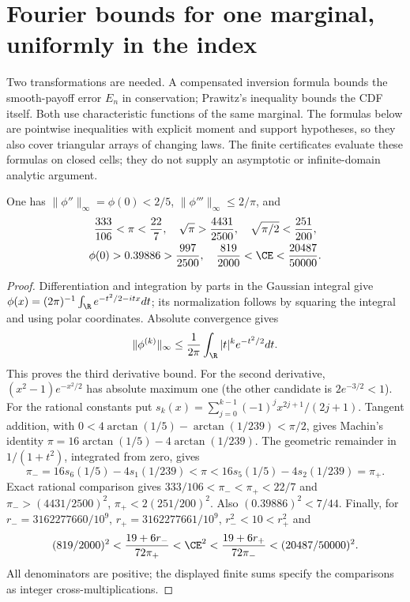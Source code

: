 \section{Fourier bounds for one marginal, uniformly in the index}\label{j:fourier:section}
Two transformations are needed. A compensated inversion formula bounds the
smooth-payoff error $E_n$ in conservation; Prawitz's inequality bounds the
CDF itself. Both use characteristic functions of the same marginal. The
formulas below are pointwise inequalities with explicit moment and support
hypotheses, so they also cover triangular arrays of changing laws. The finite
certificates evaluate these formulas on closed cells; they do not supply an
asymptotic or infinite-domain analytic argument.

\begin{lemma}\label{j:fourier:constants}
One has $\|\phi''\|_\infty=\phi(0)<2/5$,
$\|\phi'''\|_\infty\le2/\pi$, and
\begin{gather*}
 \frac{333}{106}<\pi<\frac{22}{7},\quad
 \sqrt\pi>\frac{4431}{2500},\quad
 \sqrt{\pi/2}<\frac{251}{200},\\
 \phi(0)>0.39886>\frac{997}{2500},\quad
 \frac{819}{2000}<\CE<\frac{20487}{50000}.
\end{gather*}
\end{lemma}
\begin{proof}
Differentiation and integration by parts in the Gaussian integral give
$\phi(x)=(2\pi)^{-1}\int_\R e^{-t^2/2-itx}dt$; its normalization follows
by squaring the integral and using polar coordinates. Absolute convergence gives
\[
 \|\phi^{(k)}\|_\infty\le\frac1{2\pi}\int_\R |t|^ke^{-t^2/2}dt.
\]
This proves the third derivative bound. For the second derivative,
$(x^2-1)e^{-x^2/2}$ has absolute maximum one (the other candidate is
$2e^{-3/2}<1$).
For the rational constants put
$s_k(x)=\sum_{j=0}^{k-1}(-1)^jx^{2j+1}/(2j+1)$.
Tangent addition, with $0<4\arctan(1/5)-\arctan(1/239)<\pi/2$,
gives Machin's identity $\pi=16\arctan(1/5)-4\arctan(1/239)$.
The geometric remainder in $1/(1+t^2)$, integrated from zero, gives
\[
 \pi_-=16s_6(1/5)-4s_1(1/239)<\pi
 <16s_5(1/5)-4s_2(1/239)=\pi_+.
\]
Exact rational comparison gives $333/106<\pi_-<\pi_+<22/7$ and
$\pi_->(4431/2500)^2$, $\pi_+<2(251/200)^2$.
Also $(0.39886)^2<7/44$.
Finally, for $r_-=3162277660/10^9$, $r_+=3162277661/10^9$,
$r_-^2<10<r_+^2$ and
\[
 (819/2000)^2<\frac{19+6r_-}{72\pi_+}
 <\CE^2<\frac{19+6r_+}{72\pi_-}<(20487/50000)^2.
\]
All denominators are positive; the displayed finite sums specify the
comparisons as integer cross-multiplications.
\end{proof}

